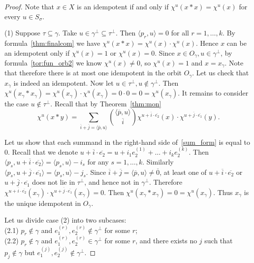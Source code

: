 \documentclass[a4paper, 11pt]{amsart}
\theoremstyle{plain}
\theoremstyle{remark}
\theoremstyle{definition}
\newcommand{\ol}[1]{\overline{#1}}
\begin{document}
\begin{proof}
	Note that $x \in X$ is an idempotent if and only if $\chi^u(x * x) = \chi^u(x)$ for every $u \in S_\sigma$.
	
	\bigskip
	
	(1) Suppose $\tau \subseteq \gamma$. Take $u \in \gamma^\perp \subseteq \tau^\perp$. Then $\langle p_r, u\rangle = 0$ for all $r = 1, \ldots, k$. By formula~\eqref{thm:finalcom} we have $\chi^u(x*x) = \chi^u(x)\cdot\chi^u(x)$. Hence $x$ can be an idempotent only if $\chi^u(x) = 1$ or $\chi^u(x) = 0$. Since $x \in O_\gamma, u \in \gamma^\perp$, by formula~\eqref{tor:fun_orb2} we know $\chi^u(x) \neq 0$, so $\chi^u(x) = 1$ and $x = x_\gamma$. Note that therefore there is at most one idempotent in the orbit $O_\gamma$. Let us check that $x_\gamma$ is indeed an idempotent. Now let $u \in \tau^\perp, u \notin \gamma^\perp$. Then $\chi^u(x_\gamma*x_\gamma) = \chi^u(x_\gamma)\cdot \chi^u(x_\gamma) = 0 \cdot 0 = 0 = \chi^u(x_\gamma)$. It remains to consider the case $u \notin \tau^\perp$. Recall that by Theorem~\ref{thm:mon}
	\begin{equation}\label{sum_form}
		\chi^u (x * y) = \sum \limits_{\ol{i} + \ol{j} = \langle \ol{p}, u \rangle } { \langle \ol{p}, u \rangle \choose \ol{i} } \chi^{u + \ol{i}\cdot \ol{e_2}}(x) \cdot  \chi^{u + \ol{j}\cdot \ol{e_1}} (y).
	\end{equation}
	
	Let us show that each summand in the right-hand side of~\eqref{sum_form} is equal to $0$. Recall that we denote $u + \ol{i}\cdot \ol{e_2} = u + i_1 e_2^{(1)} + \ldots + i_k e_2^{(k)}$. Then $\langle p_s, u + \ol{i}\cdot \ol{e_2} \rangle = \langle p_s, u\rangle - i_s$ for any $s = 1, \ldots, k$. Similarly $\langle p_s, u + \ol{j}\cdot \ol{e_1} \rangle = \langle p_s, u\rangle - j_s$. Since $\ol{i} + \ol{j} = \langle \ol{p}, u \rangle \neq \ol{0}$, at least one of $u + \ol{i}\cdot \ol{e_2}$ or $u + \ol{j}\cdot \ol{e_1}$ does not lie in $\tau^\perp$, and hence not in $\gamma^\perp$. Therefore $\chi^{u + \ol{i}\cdot \ol{e_2}}(x_\gamma) \cdot  \chi^{u + \ol{j}\cdot \ol{e_1}} (x_\gamma) = 0$. Then $\chi^u(x_\gamma*x_\gamma) = 0 = \chi^u(x_\gamma)$. Thus $x_\gamma$ is the unique idempotent in $O_\gamma$.
	
	\bigskip
	
	Let us divide case (2) into two subcases:\\
	(2.1) $p_r \notin \gamma$ and $e_1^{(r)}, e_2^{(r)} \notin \gamma^\perp$ for some $r$;\\
	(2.2) $p_r \notin \gamma$ and $e_1^{(r)}, e_2^{(r)} \in \gamma^\perp$ for some $r$, and there exists no $j$ such that $p_j \notin \gamma$ but ${e_1^{(j)}, e_2^{(j)} \notin \gamma^\perp}$.
	

\end{proof}
\end{document}
